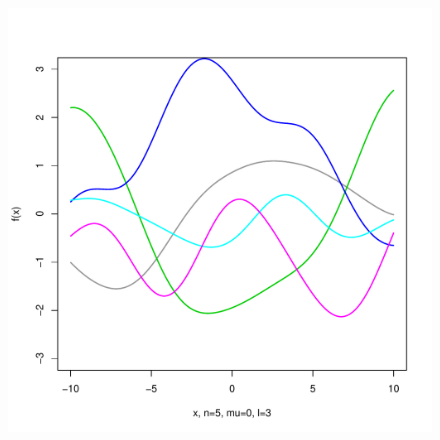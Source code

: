 \documentclass[12pt,letterpaper]{article}
\begin{document}
\begin{figure}
\begin{center}
\includegraphics[scale=0.2]{hw321/n5-m0-l3.pdf}
\end{center}
\end{figure}
\end{document}
